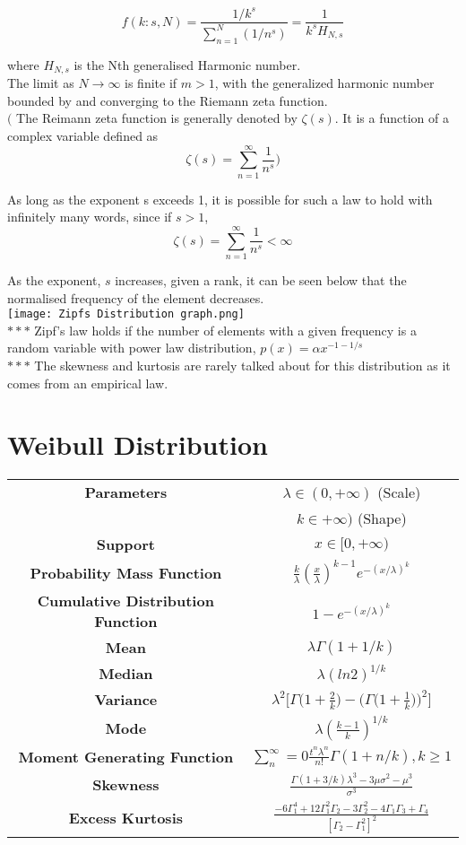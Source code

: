\documentclass[14pt, a4paper]{article}
\theoremstyle{definition}
\begin{document}
\[ f(k:s,N) = \frac{1/k^s}{\sum_{n=1}^N (1/n^s) } = \frac{1}{k^s H_{N,s}}\] 

where $H_{N,s}$ is the Nth generalised Harmonic number.
\\ The limit as $N \to \infty$ is finite if $m > 1$, with the generalized harmonic number bounded by and converging to the Riemann zeta function.
\\ $\big($ The Reimann zeta function is generally denoted by $\zeta (s)$. It is a function of a complex variable defined as 
\[ \zeta(s) = \sum^\infty_{n=1} \frac{1}{n^s} \big) \] 

As long as the exponent s exceeds 1, it is possible for such a law to hold with infinitely many words, since if $s>1$,
\[ \zeta(s) = \sum^\infty_{n=1} \frac{1}{n^s} < \infty \]

As the exponent, $s$ increases, given a rank, it can be seen below that the normalised frequency of the element decreases. 
\\ \texttt{[image: Zipfs Distribution graph.png]}
\\ $***$ Zipf's law holds if the number of elements with a given frequency is a random variable with power law distribution, $p(x) = \alpha x^{-1 -1/s}$
\\ $***$ The skewness and kurtosis are rarely talked about for this distribution as it comes from an empirical law.
\section{Weibull Distribution}

\begin{tabular}{|c|c|}  %
\hline
 \textbf{Parameters }& $\lambda \in (0,+\infty)$ (Scale) \\ & $k \in +\infty)$ (Shape) \\
 \hline
 \textbf{Support} & $x\in [0,+\infty)$ \\
 \hline
 \textbf{Probability Mass Function} & 
 $ \frac{k}{\lambda} (\frac{x}{\lambda})^{k-1} e^{-(x/\lambda)^k}$
 \\
 \hline
 \textbf{Cumulative Distribution Function} &  $1 - e^{-(x/\lambda)^k}$ \\
 \hline
 \textbf{Mean} & $\lambda \Gamma(1 + 1/k)$ \\
 \hline
 \textbf{Median} & $\lambda (ln 2)^{1/k}$ \\
 \hline
 \textbf{Variance} & $\lambda^2 \Big[ \Gamma \Big( 1 + \frac{2}{k} \Big) - \Big( \Gamma \Big( 1 + \frac{1}{k} \Big) \Big)^2 \Big]$ \\
 \hline
 \textbf{Mode} & $\lambda (\frac{k-1}{k})^{1/k}$ \\
 \hline
 \textbf{Moment Generating Function} & $\sum^\infty_n = 0 \frac{t^n \lambda^n}{n!} \Gamma(1 + n/k), k\geq 1$  \\
 \hline
 \textbf{Skewness} & $\frac{\Gamma(1+3/k) \lambda^3 - 3 \mu \sigma^2 - \mu^3}{\sigma^3}$ \\
 \hline
 \textbf{Excess Kurtosis} & $\frac{-6 \Gamma^4_1 + 12 \Gamma^2_1 \Gamma_2 - 3 \Gamma^2_2 - 4 \Gamma_1 \Gamma_3 + \Gamma_4}{[ \Gamma_2 - \Gamma^2_1]^2}$ \\
 \hline
       
  \end{tabular}
  
\end{document}
